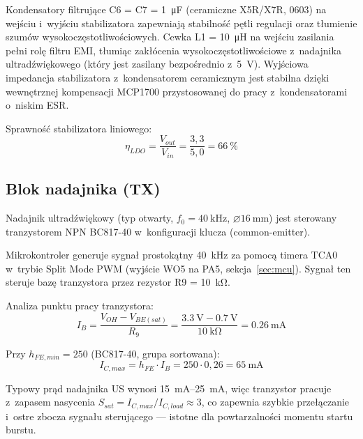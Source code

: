\documentclass[a4paper,11pt]{article}
\begin{document}
Kondensatory filtrujące C6 = C7 = \SI{1}{\micro\farad} (ceramiczne X5R/X7R, 0603)
na wejściu i~wyjściu stabilizatora zapewniają stabilność pętli regulacji
oraz tłumienie szumów wysokoczęstotliwościowych. Cewka L1 = \SI{10}{\micro\henry}
na wejściu zasilania pełni rolę filtru EMI, tłumiąc zakłócenia
wysokoczęstotliwościowe z~nadajnika ultradźwiękowego (który jest zasilany
bezpośrednio z~\SI{5}{\volt}). Wyjściowa impedancja
stabilizatora z~kondensatorem ceramicznym jest stabilna dzięki wewnętrznej
kompensacji MCP1700 przystosowanej do pracy z~kondensatorami o~niskim ESR.

Sprawność stabilizatora liniowego:
\begin{equation}
    \eta_{LDO} = \frac{V_{out}}{V_{in}} = \frac{3{,}3}{5{,}0} = \SI{66}{\percent}
    \label{eq:sprawnosc_ldo}
\end{equation}

\subsection{Blok nadajnika (TX)}
\label{sec:nadajnik}

Nadajnik ultradźwiękowy (typ otwarty, $f_0 = \SI{40}{\kilo\hertz}$,
$\varnothing\SI{16}{\milli\metre}$) jest sterowany tranzystorem NPN BC817-40
w~konfiguracji klucza (common-emitter).

Mikrokontroler generuje sygnał prostokątny \SI{40}{\kilo\hertz} za pomocą
timera TCA0 w~trybie Split Mode PWM (wyjście WO5 na PA5, sekcja~\ref{sec:mcu}).
Sygnał ten steruje bazę tranzystora
przez rezystor R9 = \SI{10}{\kilo\ohm}.

Analiza punktu pracy tranzystora:
\begin{equation}
    I_B = \frac{V_{OH} - V_{BE(sat)}}{R_9} = \frac{\SI{3,3}{\volt} - \SI{0,7}{\volt}}{\SI{10}{\kilo\ohm}} = \SI{0,26}{\milli\ampere}
    \label{eq:ib}
\end{equation}

Przy $h_{FE,min} = 250$ (BC817-40, grupa sortowana):
\begin{equation}
    I_{C,max} = h_{FE} \cdot I_B = 250 \cdot 0{,}26 = \SI{65}{\milli\ampere}
    \label{eq:ic_max}
\end{equation}

Typowy prąd nadajnika US wynosi \SIrange{15}{25}{\milli\ampere}, więc
tranzystor pracuje z~zapasem nasycenia $S_{sat} = I_{C,max} / I_{C,load}
\approx 3$, co zapewnia szybkie przełączanie i~ostre zbocza sygnału
sterującego --- istotne dla powtarzalności momentu startu burstu.
\end{document}
